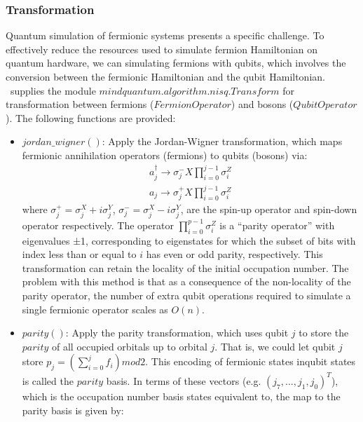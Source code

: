 \subsubsection{Transformation}
Quantum simulation of fermionic systems presents a specific challenge. To effectively reduce the resources used to simulate fermion Hamiltonian on quantum hardware, we can simulating fermions with qubits, which involves the conversion between the fermionic Hamiltonian and the qubit Hamiltonian. \MindQuantum\ supplies the module $mindquantum.algorithm.nisq.Transform$ for transformation between fermions ($FermionOperator$) and bosons ($QubitOperator$). The following functions are provided:
\begin{itemize}
    \item $jordan\_wigner()$: Apply the Jordan-Wigner transformation, which maps fermionic annihilation operators (fermions) to qubits (bosons) via:
          \begin{equation}
              \begin{split}
                  a_j^{\dagger} \to {\sigma}_j^{-} X \prod_{i=0}^{j-1} {\sigma}^Z_i \\
                  a_j \to {\sigma}_j^{+} X \prod_{i=0}^{j-1} {\sigma}^Z_i
              \end{split}
          \end{equation}
          where ${\sigma}_j^{+} = {\sigma}_j^X+i{\sigma}_j^Y$, ${\sigma}_j^{-} = {\sigma}_j^X-i{\sigma}_j^Y$, are the spin-up operator and spin-down operator respectively. The operator $\prod_{i=0}^{p-1} {{\sigma}^Z_i}$ is a “parity operator” with eigenvalues ±1, corresponding to eigenstates for which the subset of bits with index less than or equal to $i$ has even or odd parity, respectively. This transformation can retain the locality of the initial occupation number. The problem with this method is that as a consequence of the non-locality of the parity operator, the number of extra qubit operations required to simulate a single fermionic operator scales as $O(n)$.
    \item $parity()$: Apply the parity transformation, which uses qubit $j$ to store the $parity$ of all occupied orbitals up to orbital $j$. That is, we could let qubit $j$ store $p_j = (\sum_{i=0}^j f_i) mod 2$. This encoding of fermionic states inqubit states is called the $parity$ basis. In terms of these vectors (e.g. $(j_7,...,j_1,j_0)^T$), which is the occupation number basis states equivalent to, the map to the parity basis is given by:
          \begin{equation}

\end{equation}
\end{itemize}
